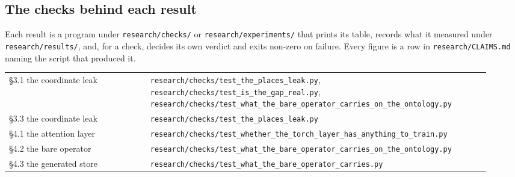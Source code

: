 \documentclass[10pt,letterpaper,twocolumn]{article}
\begin{document}
\subsection{The checks behind each result}\label{the-checks-behind-each-result}

Each result is a program under \texttt{research/\allowbreak{}checks/\allowbreak{}} or \texttt{research/\allowbreak{}experiments/\allowbreak{}} that prints its table,
records what it measured under \texttt{research/\allowbreak{}results/\allowbreak{}}, and, for a check, decides its own verdict and
exits non-zero on failure. Every figure is a row in \texttt{research/\allowbreak{}CLAIMS.\allowbreak{}md} naming the script that
produced it.

\begin{center}
{\footnotesize
{}
\tabletail{\midrule}
\tablelasttail{\bottomrule}
\begin{xtabular}{L{0.276\linewidth}L{0.655\linewidth}}
§3.1 the coordinate leak & \texttt{research/\allowbreak{}checks/\allowbreak{}test\_\allowbreak{}the\_\allowbreak{}places\_\allowbreak{}leak.\allowbreak{}py},
\texttt{research/\allowbreak{}checks/\allowbreak{}test\_\allowbreak{}is\_\allowbreak{}the\_\allowbreak{}gap\_\allowbreak{}real.\allowbreak{}py},
\texttt{research/\allowbreak{}checks/\allowbreak{}test\_\allowbreak{}what\_\allowbreak{}the\_\allowbreak{}bare\_\allowbreak{}operator\_\allowbreak{}carries\_\allowbreak{}on\_\allowbreak{}the\_\allowbreak{}ontology.\allowbreak{}py} \\
§3.3 the coordinate leak & \texttt{research/\allowbreak{}checks/\allowbreak{}test\_\allowbreak{}the\_\allowbreak{}places\_\allowbreak{}leak.\allowbreak{}py} \\
§4.1 the attention layer & \texttt{research/\allowbreak{}checks/\allowbreak{}test\_\allowbreak{}whether\_\allowbreak{}the\_\allowbreak{}torch\_\allowbreak{}layer\_\allowbreak{}has\_\allowbreak{}anything\_\allowbreak{}to\_\allowbreak{}train.\allowbreak{}py} \\
§4.2 the bare operator & \texttt{research/\allowbreak{}checks/\allowbreak{}test\_\allowbreak{}what\_\allowbreak{}the\_\allowbreak{}bare\_\allowbreak{}operator\_\allowbreak{}carries\_\allowbreak{}on\_\allowbreak{}the\_\allowbreak{}ontology.\allowbreak{}py} \\
§4.3 the generated store & \texttt{research/\allowbreak{}checks/\allowbreak{}test\_\allowbreak{}what\_\allowbreak{}the\_\allowbreak{}bare\_\allowbreak{}operator\_\allowbreak{}carries.\allowbreak{}py} \\

\end{xtabular}}
\end{center}
\end{document}
